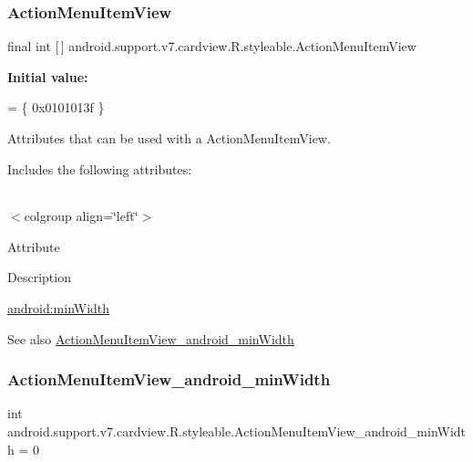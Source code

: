 \subsubsection{\texorpdfstring{Action\+Menu\+Item\+View}{ActionMenuItemView}}
{\footnotesize\ttfamily final int \mbox{[}$\,$\mbox{]} android.\+support.\+v7.\+cardview.\+R.\+styleable.\+Action\+Menu\+Item\+View\hspace{0.3cm}{\ttfamily [static]}}

{\bfseries Initial value\+:}
\begin{DoxyCode}
= \{
            0x0101013f
        \}
\end{DoxyCode}
Attributes that can be used with a Action\+Menu\+Item\+View. 

Includes the following attributes\+:

\tabulinesep=1mm
\begin{longtabu} spread 0pt [c]{*{0}{|X[-1]}|}
\hline
\end{longtabu}
$<$colgroup align=\char`\"{}left\char`\"{}$>$ 

Attribute

Description 

{\ttfamily \hyperlink{classandroid_1_1support_1_1v7_1_1cardview_1_1R_1_1styleable_a4524a3edc5294fc1998c0c59dc8ce3c1}{android\+:min\+Width}}

\begin{DoxySeeAlso}{See also}
\hyperlink{classandroid_1_1support_1_1v7_1_1cardview_1_1R_1_1styleable_a4524a3edc5294fc1998c0c59dc8ce3c1}{Action\+Menu\+Item\+View\+\_\+android\+\_\+min\+Width} 
\end{DoxySeeAlso}
\mbox{\label{classandroid_1_1support_1_1v7_1_1cardview_1_1R_1_1styleable_a4524a3edc5294fc1998c0c59dc8ce3c1}} 
\subsubsection{\texorpdfstring{Action\+Menu\+Item\+View\+\_\+android\+\_\+min\+Width}{ActionMenuItemView\_android\_minWidth}}
{\footnotesize\ttfamily int android.\+support.\+v7.\+cardview.\+R.\+styleable.\+Action\+Menu\+Item\+View\+\_\+android\+\_\+min\+Width = 0\hspace{0.3cm}{\ttfamily [static]}}


